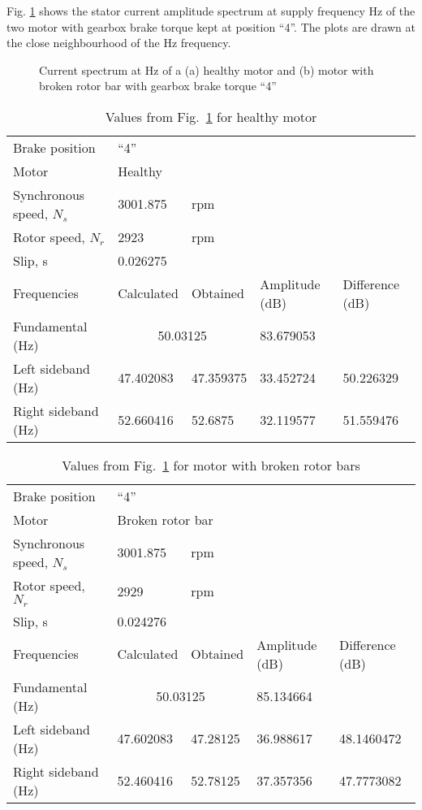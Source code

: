 \documentclass[a4paper,11pt]{report}
\begin{document}
\clearpage
Fig. \ref{hb450ss} shows the stator current amplitude spectrum at supply frequency \unit[50]{Hz} of the two motor with gearbox brake torque kept at position ``4''. The plots are drawn at the close neighbourhood of the \unit[50]{Hz} frequency.

\begin{figure}[htbp]
\centering
\subfigure[]{\texttt{[image: h450]}}
\subfigure[]{\texttt{[image: b450]}}
\caption{Current spectrum at \unit[50]{Hz} of a (a) healthy motor and (b) motor with broken rotor bar with gearbox brake torque ``4''} \label{hb450ss}
\end{figure}

\begin{table}[h]
\centering
\begin{tabular}{lllll}
Brake position	& ``4'' & & & \\			
Motor &	\multicolumn{4}{l}{Healthy} \\ 
Synchronous speed, $N_{s}$	&3001.875  & rpm & & \\			
Rotor speed, $N_{r}$ 	  	& 2923	& rpm& & \\		
Slip, s			  	&  \multicolumn{4}{l}{0.026275} \\			
Frequencies 		  	& Calculated & Obtained & Amplitude (dB) & Difference (dB) \\
Fundamental (Hz)		& \multicolumn{2}{c}{50.03125}	& 83.679053 &  \\ 
Left sideband (Hz) 		& 47.402083 & 47.359375 & 33.452724 & 50.226329 \\
Right sideband (Hz)		& 52.660416 & 52.6875 &   32.119577 & 51.559476
\end{tabular}
\caption{Values from Fig.~\ref{hb450ss} for healthy motor} \label{h450sst}
\end{table}

\begin{table}[h]
\centering
\begin{tabular}{lllll}
Brake position	& ``4'' & & & \\			
Motor &	\multicolumn{4}{l}{Broken rotor	bar} \\ 
Synchronous speed, $N_{s}$	& 3001.875 & rpm & & \\			
Rotor speed, $N_{r}$ 	  	& 2929	& rpm& & \\		
Slip, s			  	&  \multicolumn{4}{l}{0.024276} \\			
Frequencies 		  	& Calculated & Obtained & Amplitude (dB) & Difference (dB) \\
Fundamental (Hz)		& \multicolumn{2}{c}{50.03125}	& 85.134664	&  \\ 
Left sideband (Hz) 		& 47.602083 & 47.28125 & 36.988617 & 48.1460472 \\
Right sideband (Hz)		& 52.460416 & 52.78125 & 37.357356 & 47.7773082 
\end{tabular}
\caption{Values from Fig.~\ref{hb450ss} for motor with broken rotor bars} \label{b450sst}
\end{table}
\end{document}
